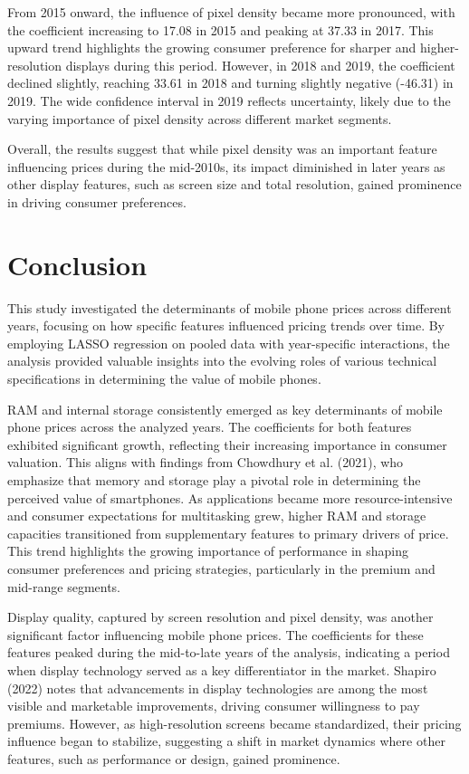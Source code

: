 \documentclass[12pt]{article}
\begin{document}
From 2015 onward, the influence of pixel density became more pronounced, with the coefficient increasing to 17.08 in 2015 and peaking at 37.33 in 2017. This upward trend highlights the growing consumer preference for sharper and higher-resolution displays during this period. However, in 2018 and 2019, the coefficient declined slightly, reaching 33.61 in 2018 and turning slightly negative (-46.31) in 2019. The wide confidence interval in 2019 reflects uncertainty, likely due to the varying importance of pixel density across different market segments.

Overall, the results suggest that while pixel density was an important feature influencing prices during the mid-2010s, its impact diminished in later years as other display features, such as screen size and total resolution, gained prominence in driving consumer preferences.
\clearpage
\section{Conclusion}
This study investigated the determinants of mobile phone prices across different years, focusing on how specific features influenced pricing trends over time. By employing LASSO regression on pooled data with year-specific interactions, the analysis provided valuable insights into the evolving roles of various technical specifications in determining the value of mobile phones.

RAM and internal storage consistently emerged as key determinants of mobile phone prices across the analyzed years. The coefficients for both features exhibited significant growth, reflecting their increasing importance in consumer valuation. This aligns with findings from Chowdhury et al. (2021), who emphasize that memory and storage play a pivotal role in determining the perceived value of smartphones. As applications became more resource-intensive and consumer expectations for multitasking grew, higher RAM and storage capacities transitioned from supplementary features to primary drivers of price. This trend highlights the growing importance of performance in shaping consumer preferences and pricing strategies, particularly in the premium and mid-range segments.

Display quality, captured by screen resolution and pixel density, was another significant factor influencing mobile phone prices. The coefficients for these features peaked during the mid-to-late years of the analysis, indicating a period when display technology served as a key differentiator in the market. Shapiro (2022) notes that advancements in display technologies are among the most visible and marketable improvements, driving consumer willingness to pay premiums. However, as high-resolution screens became standardized, their pricing influence began to stabilize, suggesting a shift in market dynamics where other features, such as performance or design, gained prominence.
\end{document}
